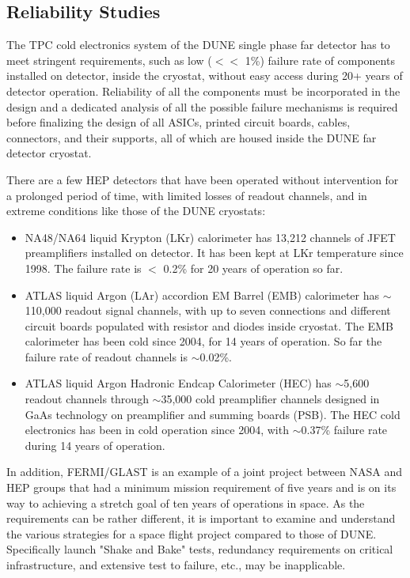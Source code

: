 \subsection{Reliability Studies}
\label{sec:fdsp-tpcelec-qa-reliability}

The TPC cold electronics system of the DUNE single phase far detector has to meet stringent requirements, such as low ($<<$ 1\%) failure rate of components installed on detector, inside the cryostat, without easy access during 20+ years of detector operation. Reliability of all the components must be incorporated in the design and a dedicated analysis of all the possible failure mechanisms is required before finalizing the design of all ASICs, printed circuit boards, cables, connectors, and their supports, all of which are housed inside the DUNE far detector cryostat. 

There are a few HEP detectors that have been operated without intervention for a prolonged period of time, with limited losses of readout channels, and in extreme conditions like those of the DUNE cryostats:
\begin{itemize}
	\item NA48/NA64 liquid Krypton (LKr) calorimeter has 13,212 channels of JFET preamplifiers installed on detector. It has been kept at LKr temperature since 1998. The failure rate is $<$ 0.2\% for 20 years of operation so far.
	\item ATLAS liquid Argon (LAr) accordion EM Barrel (EMB) calorimeter has $\sim$110,000 readout signal channels, with up to seven connections and different circuit boards populated with resistor and diodes inside cryostat. The EMB calorimeter has been cold since 2004, for 14 years of operation.  So far the failure rate of readout channels is $\sim$0.02\%.
	\item ATLAS liquid Argon Hadronic Endcap Calorimeter (HEC) has $\sim$5,600 readout channels through $\sim$35,000 cold preamplifier channels designed in GaAs technology on preamplifier and summing boards (PSB). The HEC cold electronics has been in cold operation since 2004, with $\sim$0.37\% failure rate during 14 years of operation. 
\end{itemize}
In addition, FERMI/GLAST is an example of a joint project between NASA and HEP groups that had a minimum mission requirement of five years and is on its way to achieving a stretch goal of ten years of operations in space. As the requirements can be rather different, it is important to examine and understand the various strategies for a space flight project compared to those of DUNE. Specifically launch "Shake and Bake" tests, redundancy requirements on critical infrastructure, and extensive test to failure, etc., may be inapplicable.

